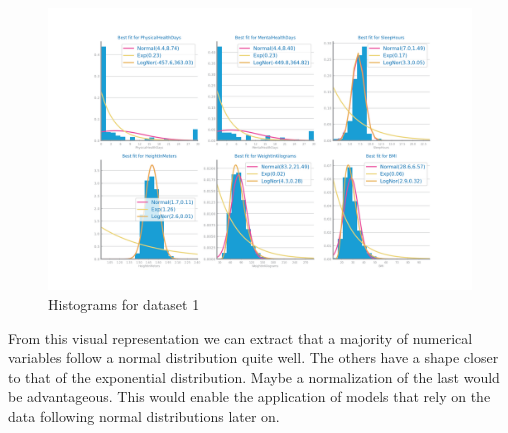 \documentclass[10pt]{extarticle}
\begin{document}
\begin{figure}[H]
\centering\includegraphics[scale=0.6]{images/dataset1/data_profiling/CovidPos_histogram_numeric_distribution.png}
\caption{Histograms for dataset 1} %
\end{figure}
From this visual representation we can extract that a majority of numerical variables follow a normal distribution quite well. 
The others have a shape closer to that of the exponential distribution. Maybe a normalization of the last would be advantageous.
This would enable the application of models that rely on the data following normal distributions later on. 
\end{document}
